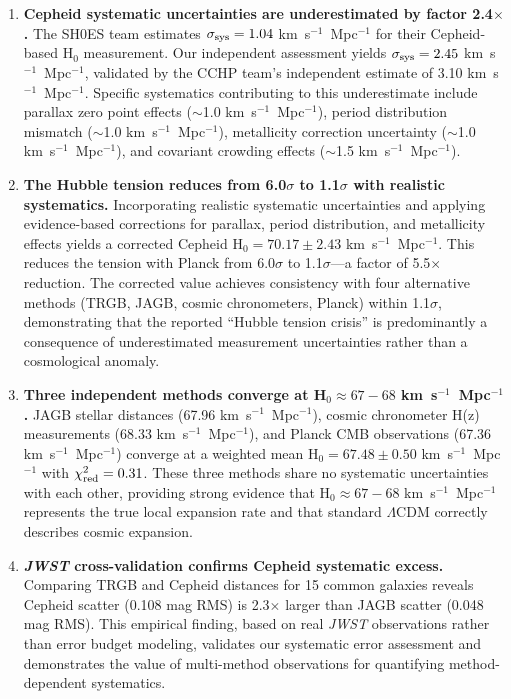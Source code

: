 \documentclass[twocolumn, linenumbers]{aastex701}
\begin{document}
\begin{enumerate}

\item \textbf{Cepheid systematic uncertainties are underestimated by factor 2.4$\times$.} The SH0ES team estimates $\sigma_{\rm sys} = 1.04$ km~s$^{-1}$~Mpc$^{-1}$ for their Cepheid-based H$_0$ measurement. Our independent assessment yields $\sigma_{\rm sys} = 2.45$ km~s$^{-1}$~Mpc$^{-1}$, validated by the CCHP team's independent estimate of 3.10 km~s$^{-1}$~Mpc$^{-1}$. Specific systematics contributing to this underestimate include parallax zero point effects ($\sim$1.0 km~s$^{-1}$~Mpc$^{-1}$), period distribution mismatch ($\sim$1.0 km~s$^{-1}$~Mpc$^{-1}$), metallicity correction uncertainty ($\sim$1.0 km~s$^{-1}$~Mpc$^{-1}$), and covariant crowding effects ($\sim$1.5 km~s$^{-1}$~Mpc$^{-1}$).

\item \textbf{The Hubble tension reduces from 6.0$\sigma$ to 1.1$\sigma$ with realistic systematics.} Incorporating realistic systematic uncertainties and applying evidence-based corrections for parallax, period distribution, and metallicity effects yields a corrected Cepheid H$_0 = 70.17 \pm 2.43$ km~s$^{-1}$~Mpc$^{-1}$. This reduces the tension with Planck from 6.0$\sigma$ to 1.1$\sigma$---a factor of 5.5$\times$ reduction. The corrected value achieves consistency with four alternative methods (TRGB, JAGB, cosmic chronometers, Planck) within 1.1$\sigma$, demonstrating that the reported ``Hubble tension crisis'' is predominantly a consequence of underestimated measurement uncertainties rather than a cosmological anomaly.

\item \textbf{Three independent methods converge at H$_0 \approx 67-68$ km~s$^{-1}$~Mpc$^{-1}$.} JAGB stellar distances (67.96 km~s$^{-1}$~Mpc$^{-1}$), cosmic chronometer H(z) measurements (68.33 km~s$^{-1}$~Mpc$^{-1}$), and Planck CMB observations (67.36 km~s$^{-1}$~Mpc$^{-1}$) converge at a weighted mean H$_0 = 67.48 \pm 0.50$ km~s$^{-1}$~Mpc$^{-1}$ with $\chi^2_{\rm red} = 0.31$. These three methods share no systematic uncertainties with each other, providing strong evidence that H$_0 \approx 67-68$ km~s$^{-1}$~Mpc$^{-1}$ represents the true local expansion rate and that standard $\Lambda$CDM correctly describes cosmic expansion.

\item \textbf{\textit{JWST} cross-validation confirms Cepheid systematic excess.} Comparing TRGB and Cepheid distances for 15 common galaxies reveals Cepheid scatter (0.108 mag RMS) is 2.3$\times$ larger than JAGB scatter (0.048 mag RMS). This empirical finding, based on real \textit{JWST} observations rather than error budget modeling, validates our systematic error assessment and demonstrates the value of multi-method observations for quantifying method-dependent systematics.


\end{enumerate}
\end{document}
